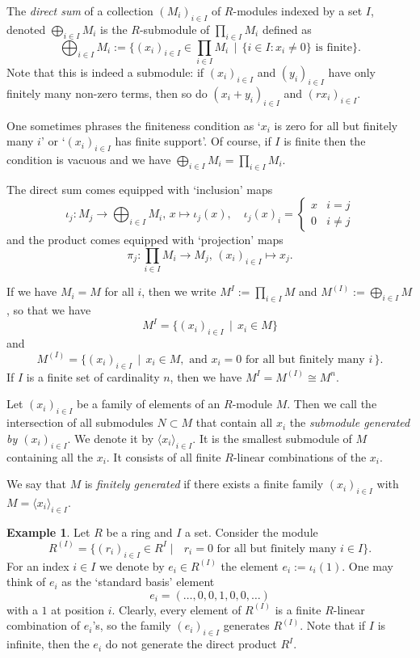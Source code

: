 \documentclass[11pt]{amsbook}
\theoremstyle{plain}
\theoremstyle{definition}
\newtheorem{example}[theorem]{Example}
\begin{document}
The \emph{direct sum} of a collection $(M_i)_{i\in I}$ of $R$-modules indexed by a set $I$, denoted $\bigoplus_{i\in I} M_i$ is the $R$-submodule of $\prod_{i\in I} M_i$ defined as
\[
	\bigoplus_{i\in I} M_i := \Big\{ (x_i)_{i\in I} \in \prod_{i\in I} M_i \,\mid\,
	\{i\in I \colon x_i\neq 0\} \text{ is finite}\Big\}.
\]
Note that this is indeed a submodule: if $(x_i)_{i\in I}$ and $(y_i)_{i\in I}$  have only finitely many non-zero terms, then so do $(x_i+y_i)_{i\in I}$ and $(rx_i)_{i\in I}$.  

One sometimes phrases the finiteness condition as  `$x_i$ is zero for all but finitely many $i$' or `$(x_i)_{i\in I}$ has finite support'. Of course, if $I$ is finite then the condition is vacuous and we have $\bigoplus_{i\in I} M_i = \prod_{i\in I} M_i$.

The direct sum comes equipped with `inclusion' maps
\[
	\iota_j\colon M_j \to \bigoplus_{i\in I} M_i,\, x \mapsto \iota_j(x),\quad
	\iota_j(x)_i = \begin{cases} x & i=j \\ 0 & i\neq j \end{cases}
\]
and the product comes equipped with `projection' maps
\[
	\pi_j\colon  \prod_{i\in I} M_i \to M_j,\, (x_i)_{i\in I} \mapsto x_j.
\]


If we have $M_i=M$ for all $i$, then we write $M^I := \prod_{i\in I} M$ and $M^{(I)} := \bigoplus_{i\in I} M$,
so that we have
\[
	M^{I} = \{ (x_i )_{i\in I} \,\mid\, x_i \in M \}
\]
and
\[
	M^{(I)} = \big\{ (x_i)_{i\in I} \,\mid\, x_i \in M, \text{ and $x_i=0$ for all but  finitely many $i$}\, \big\}.
\]
If $I$ is a finite set of cardinality $n$, then we have $M^{I} = M^{(I)} \cong M^n$.


\bigskip

Let $(x_i)_{i \in I}$ be a family of elements of an $R$-module $M$. Then we call the intersection of all submodules $N\subset M$ that  contain all $x_i$ the \emph{submodule generated by $(x_i)_{i\in I}$}. We denote it by $\langle x_i \rangle_{i \in I}$.  It is the smallest submodule of $M$ containing all the $x_i$. It consists of all finite $R$-linear combinations of the $x_i$.

We say that $M$ is  \emph{finitely generated} if there exists a finite family $(x_i)_{i\in I}$ with $M=\langle x_i \rangle_{i\in I}$.

\begin{example}\label{ex:free-module}
Let $R$ be a ring and $I$ a set. Consider the module
\[
	R^{(I)}  = \Big\{ (r_i)_{i\in I} \in R^I \mid  \text{  $r_i=0$ for all but finitely many $i\in I$} \Big\}.
\]
For an index $i\in I$ we denote by $e_i \in R^{(I)}$ the element $e_i := \iota_i(1)$. One may think of $e_i$ as the `standard basis' element
\[
	e_i = ( \ldots, 0, 0, 1, 0, 0, \ldots  )
\]
with a $1$ at position $i$.  Clearly, every element of $R^{(I)}$ is a finite $R$-linear combination of $e_i$'s, so the family $(e_i)_{i \in I}$ generates $R^{(I)}$. Note that if $I$ is infinite, then the $e_i$ do not generate the direct product $R^{I}$. 
\end{example}
\end{document}
